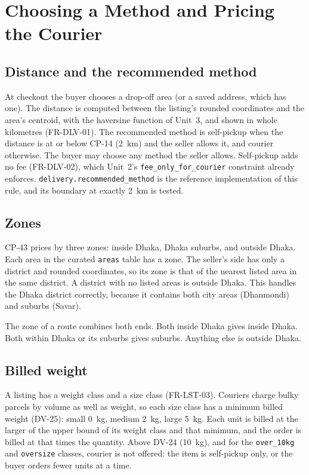 \documentclass[11pt,a4paper]{article}
\begin{document}
\section{Choosing a Method and Pricing the Courier}
\label{sec:pricing}

\subsection{Distance and the recommended method}
At checkout the buyer chooses a drop-off area (or a saved address, which has one). The distance is computed between the listing's rounded coordinates and the area's centroid, with the haversine function of Unit~3, and shown in whole kilometres (FR-DLV-01). The recommended method is self-pickup when the distance is at or below CP-14 (2~km) and the seller allows it, and courier otherwise. The buyer may choose any method the seller allows. Self-pickup adds no fee (FR-DLV-02), which Unit~2's \texttt{fee\_only\_for\_courier} constraint already enforces. \texttt{delivery.recommended\_method} is the reference implementation of this rule, and its boundary at exactly 2~km is tested.

\subsection{Zones}
CP-43 prices by three zones: inside Dhaka, Dhaka suburbs, and outside Dhaka. Each area in the curated \texttt{areas} table has a zone. The seller's side has only a district and rounded coordinates, so its zone is that of the nearest listed area in the same district. A district with no listed areas is outside Dhaka. This handles the Dhaka district correctly, because it contains both city areas (Dhanmondi) and suburbs (Savar).

The zone of a route combines both ends. Both inside Dhaka gives inside Dhaka. Both within Dhaka or its suburbs gives suburbs. Anything else is outside Dhaka.

\subsection{Billed weight}
A listing has a weight class and a size class (FR-LST-03). Couriers charge bulky parcels by volume as well as weight, so each size class has a minimum billed weight (DV-25): small 0~kg, medium 2~kg, large 5~kg. Each unit is billed at the larger of the upper bound of its weight class and that minimum, and the order is billed at that times the quantity. Above DV-24 (10~kg), and for the \texttt{over\_10kg} and \texttt{oversize} classes, courier is not offered: the item is self-pickup only, or the buyer orders fewer units at a time.
\end{document}
